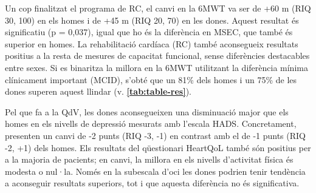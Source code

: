 \documentclass[CAT]{TFUOC}%
\begin{document}
Un cop finalitzat el programa de RC, el canvi en la 6MWT va ser de +60 m (RIQ 30, 100) en els homes i de +45 m (RIQ 20, 70) en les dones. Aquest resultat és significatiu (p = 0,037), igual que ho és la diferència en MSEC, que també és superior en homes. La rehabilitació cardíaca (RC) també aconsegueix resultats positius a la resta de mesures de capacitat funcional, sense diferències destacables entre sexes. Si es binaritza la millora en la 6MWT utilitzant la diferència mínima clínicament important (MCID), s'obté que un 81\% dels homes i un 75\% de les dones superen aquest llindar (v. \textbf{\autoref{tab:table-res}}).

Pel que fa a la QdV, les dones aconsegueixen una disminuació major que els homes en els nivells de depressió mesurats amb l'escala HADS. Concretament, presenten un canvi de -2 punts (RIQ -3, -1) en contrast amb el de -1 punts (RIQ -2, +1) dels homes. Els resultats del qüestionari HeartQoL també són positius per a la majoria de pacients; en canvi, la millora en els nivells d'activitat física és modesta o nul·la. Només en la subescala d'oci les dones podrien tenir tendència a aconseguir resultats superiors, tot i que aquesta diferència no és significativa.
\end{document}
